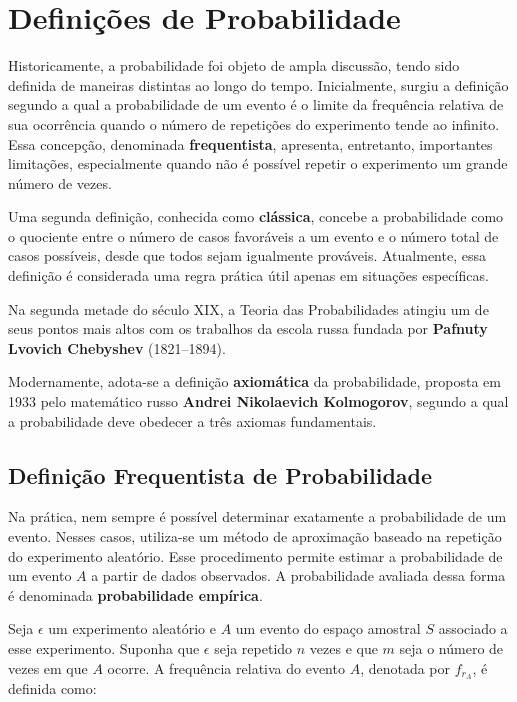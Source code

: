 \newpage
\section{Definições de Probabilidade}

Historicamente, a probabilidade foi objeto de ampla discussão, tendo sido definida de maneiras distintas ao longo do tempo. Inicialmente, surgiu a definição segundo a qual a probabilidade de um evento é o limite da frequência relativa de sua ocorrência quando o número de repetições do experimento tende ao infinito. Essa concepção, denominada \textbf{frequentista}, apresenta, entretanto, importantes limitações, especialmente quando não é possível repetir o experimento um grande número de vezes.\vskip0.3cm
 
Uma segunda definição, conhecida como \textbf{clássica}, concebe a probabilidade como o quociente entre o número de casos favoráveis a um evento e o número total de casos possíveis, desde que todos sejam igualmente prováveis. Atualmente, essa definição é considerada uma regra prática útil apenas em situações específicas.\vskip0.3cm

Na segunda metade do século XIX, a Teoria das Probabilidades atingiu um de seus pontos mais altos com os trabalhos da escola russa fundada por \textbf{Pafnuty Lvovich Chebyshev} (1821--1894).\vskip0.3cm
 
Modernamente, adota-se a definição \textbf{axiomática} da probabilidade, proposta em 1933 pelo matemático russo \textbf{Andrei Nikolaevich Kolmogorov}, segundo a qual a probabilidade deve obedecer a três axiomas fundamentais.


 

\subsection{Definição Frequentista de Probabilidade}

Na prática, nem sempre é possível determinar exatamente a probabilidade de um evento. Nesses casos, utiliza-se um método de aproximação baseado na repetição do experimento aleatório. Esse procedimento permite estimar a probabilidade de um evento $A$ a partir de dados observados. A probabilidade avaliada dessa forma é denominada \textbf{probabilidade empírica}.\vskip0.3cm

Seja $\epsilon$ um experimento aleatório e $A$ um evento do espaço amostral $S$ associado a esse experimento. Suponha que $\epsilon$ seja repetido $n$ vezes e que $m$ seja o número de vezes em que $A$ ocorre. A frequência relativa do evento $A$, denotada por $f_{r_A}$, é definida como:

